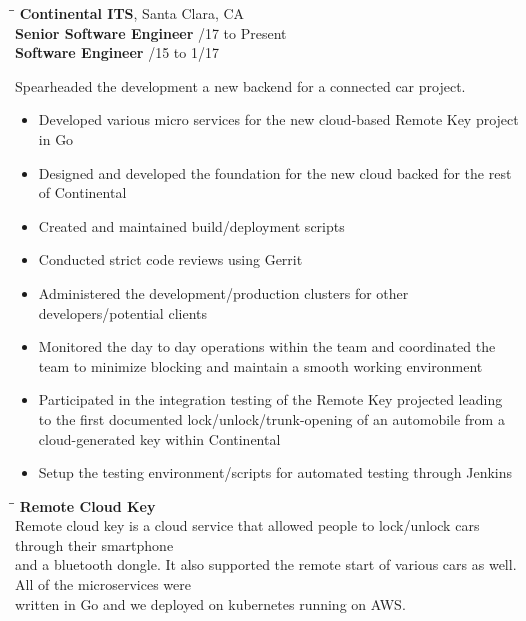 \documentclass{res}
\begin{document}
\begin{resume}
   \begin{tabbing}
   	\hspace{2.3in}\= \hspace{2.6in}\= \kill %
   	{\bf Continental ITS}, Santa Clara, CA \\
	{\bf Senior Software Engineer} \> /17 to Present \\
   	{\bf Software Engineer} \> /15 to 1/17 \\
   \end{tabbing}\vspace{-32pt}      %
   Spearheaded the development a new backend for a connected car project.
   \vspace{2pt}
   \begin{itemize}\addtolength{\itemsep}{-0.5\baselineskip}
	\item Developed various micro services for the new cloud-based Remote Key project in Go
	\item Designed and developed the foundation for the new cloud backed for the rest of Continental
	\item Created and maintained build/deployment scripts
	\item Conducted strict code reviews using Gerrit
	\item Administered the development/production clusters for other developers/potential clients
	\item Monitored the day to day operations within the team and coordinated the team to minimize blocking and maintain a smooth working environment
   	\item Participated in the integration testing of the Remote Key projected leading to the first documented lock/unlock/trunk-opening of an automobile from a cloud-generated key within Continental
	\item Setup the testing environment/scripts for automated testing through Jenkins
   \end{itemize}
   
   \vspace{-10pt}
   \hspace{3pt}{\bf Projects}
   \vspace{-20pt}
   \begin{tabbing}
   	\hspace{0.25in}\= \hspace{0.25in}\= \kill %
   	\> {\bf Remote Cloud Key} \\	   	   
   	\>\> Remote cloud key is a cloud service that allowed people to lock/unlock cars through their smartphone\\
 and a bluetooth dongle.  It also supported the remote start of various cars as well.  All of the microservices were \\
written in Go and we deployed on kubernetes running on AWS.
   \end{tabbing}
   \vspace{-20pt}


\end{resume}
\end{document}
